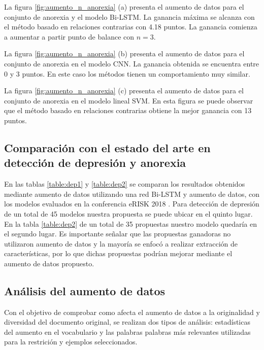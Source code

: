 La figura \ref{fig:aumento_n_anorexia} (a) presenta el aumento de datos para el conjunto de anorexia y el modelo Bi-LSTM. La ganancia máxima se alcanza con el método basado en relaciones contrarias con 4.18 puntos. La ganancia comienza a aumentar a partir punto de balance con $n=3$. 

La figura \ref{fig:aumento_n_anorexia} (b) presenta el aumento de datos para el conjunto de anorexia en el modelo CNN. La ganancia obtenida se encuentra entre 0 y 3 puntos. En este caso los métodos tienen un comportamiento muy similar.

La figura \ref{fig:aumento_n_anorexia} (c) presenta el aumento de datos para el conjunto de anorexia en el modelo lineal SVM. En esta figura se puede observar que el método basado en relaciones contrarias obtiene la mejor ganancia con 13 puntos.
\newpage



\newpage

\newpage

\subsection{Comparación con el estado del arte en detección de depresión y anorexia}
En las tablas \ref{table:dep1} y \ref{table:dep2} se comparan los resultados obtenidos mediante aumento de datos utilizando una red Bi-LSTM y aumento de datos, con los modelos evaluados en la conferencia eRISK 2018 \cite{Losada2018}. Para detección de depresión de un total de 45 modelos nuestra propuesta se puede ubicar en el quinto lugar. En la tabla \ref{table:dep2} de un total de 35 propuestas nuestro modelo quedaría en el segundo lugar. Es importante señalar que las propuestas ganadoras no utilizaron aumento de datos y la mayoría se enfocó a realizar extracción de características, por lo que dichas propuestas podrían mejorar mediante el aumento de datos propuesto.



\subsection{Análisis del aumento de datos}
Con el objetivo de comprobar como afecta el aumento de datos a la originalidad y diversidad del documento original, se realizan dos tipos de análisis: estadísticas del aumento en el vocabulario y las palabras palabras más relevantes utilizadas para la restrición y ejemplos seleccionados.

